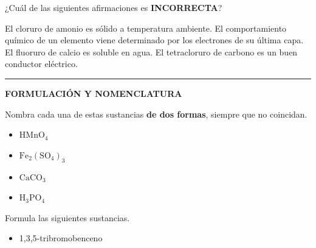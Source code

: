 \documentclass[a4paper,addpoints,14pt]{exam}
\newcommand*\chem[1]{\ensuremath{\mathrm{#1}}}
\newcommand{\halmos}{\vspace*{-4mm}
	
					\begin{flushright}
						\rule{1mm}{2.5mm} 
					\end{flushright}\vspace*{-4mm}
						
					  }
\renewcommand{\qed}{\halmos}
\begin{document}
\begin{questions}
\question[1] ¿Cuál de las siguientes afirmaciones es {\small \textbf{INCORRECTA}}?
		\begin{checkboxes} 
		\choice El cloruro de amonio es sólido a temperatura ambiente.
		\choice El comportamiento químico de un elemento viene determinado por los electrones de su última capa.
		\choice El fluoruro de calcio es soluble en agua.
		\CorrectChoice El tetracloruro de carbono es un buen conductor eléctrico. 
		\end{checkboxes}
\qed
\vspace*{3ex}


\begin{formulacion}
\textbf{FORMULACIÓN Y NOMENCLATURA}
\end{formulacion}


\begin{question}[4]
	Nombra cada una de estas sustancias \textbf{de dos formas}, siempre que no coincidan. 
	\begin{itemize}
		\item $\chem{HMnO_4}$
		\vspace{50pt}
		
				
		\item $\chem{Fe_2(SO_4)_3}$
		\vspace{50pt}
		
		
		\item $\chem{CaCO_3}$\vspace{50pt}
		
		\item $\chem{H_3PO_4}$\vspace{50pt}
		
	
	\end{itemize}
\end{question}



\begin{question}[4] Formula las siguientes sustancias. 

		\begin{itemize}
		\item 1,3,5-tribromobenceno\vspace{50pt}
		

\end{itemize}
\end{question}
\end{questions}
\end{document}
